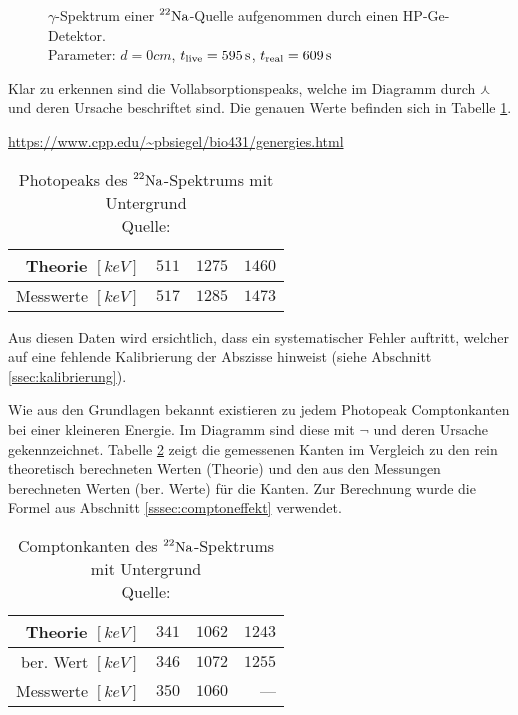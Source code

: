 		\begin{figure}[htb]
			\centering
			
			\caption{$\gamma$-Spektrum einer $\prescript{22}{}{\mathrm{Na}}$-Quelle aufgenommen durch einen HP-Ge-Detektor. \\ Parameter: $d=0\unit{cm}$, $t_{\mathrm{live}}=595\, \mathrm{s}$, $t_{\mathrm{real}}=609\, \mathrm{s}$} %
			\label{fig:na-22-spec-1}
		\end{figure}

		Klar zu erkennen sind die Vollabsorptionspeaks, welche im Diagramm durch $\curlywedge$ und deren Ursache beschriftet sind.
		Die genauen Werte befinden sich in Tabelle \ref{tab:na-22-peaks}.

		\url{https://www.cpp.edu/~pbsiegel/bio431/genergies.html}
		\begin{table}[H]
			\centering
			\begin{tabular}{r||r|r|r}
				Theorie $[\unit{keV}]$ & $511$ & $1275$ & $1460$ \\
				\hline
				Messwerte $[\unit{keV}]$ & $517$ & $1285$ & $1473$ \\
			\end{tabular}
			\caption{Photopeaks des $\prescript{22}{}{\mathrm{Na}}$-Spektrums mit Untergrund \\ Quelle: }
			\label{tab:na-22-peaks}
		\end{table}

		Aus diesen Daten wird ersichtlich, dass ein systematischer Fehler auftritt, welcher auf eine fehlende Kalibrierung der Abszisse hinweist (siehe Abschnitt \ref{ssec:kalibrierung}).

		Wie aus den Grundlagen bekannt existieren zu jedem Photopeak Comptonkanten bei einer kleineren Energie.
		Im Diagramm sind diese mit $\neg$ und deren Ursache gekennzeichnet.
		Tabelle \ref{tab:na-22-compton} zeigt die gemessenen Kanten im Vergleich zu den rein theoretisch berechneten Werten (Theorie) und den aus den Messungen berechneten Werten (ber. Werte) für die Kanten.
		Zur Berechnung wurde die Formel aus Abschnitt \ref{sssec:comptoneffekt} verwendet.

		\begin{table}[H]
			\centering
			\begin{tabular}{r||r|r|r}
				Theorie $[\unit{keV}]$ & $341$ & $1062$ & $1243$ \\
				\hline
				ber. Wert $[\unit{keV}]$ & $346$ & $1072$ & $1255$ \\
				\hline
				Messwerte $[\unit{keV}]$ & $350$ & $1060$ & --- \\
			\end{tabular}
			\caption{Comptonkanten des $\prescript{22}{}{\mathrm{Na}}$-Spektrums mit Untergrund \\ Quelle: }
			\label{tab:na-22-compton}
		\end{table}

